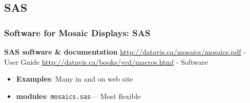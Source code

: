 \subsection{SAS}
\begin{frame}
  \frametitle{Software for Mosaic Displays: SAS}
  \begin{block}{\large\bfseries SAS software \& documentation}
	\url{http://datavis.ca/mosaics/mosaics.pdf} - User Guide
	\url{http://datavis.ca/books/vcd/macros.html} - Software

   \begin{itemize}
	\item {\large\bfseries Examples}: Many in \VCD{} and on web site

	\item{\large\bfseries \IML{} modules}: \texttt{mosaics.sas}--- Most flexible
    \end{itemize}
  \end{block}

\end{frame}

